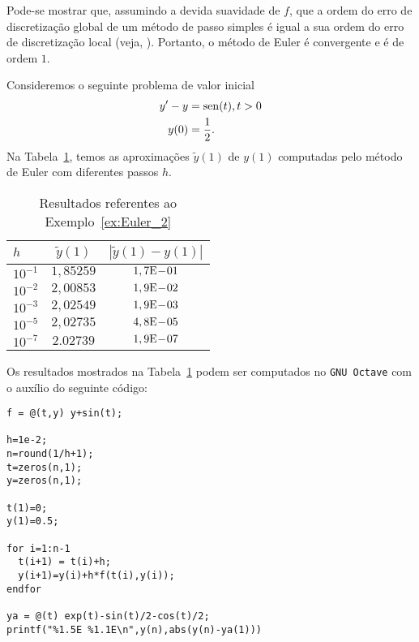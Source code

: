 \begin{obs}
  Pode-se mostrar que, assumindo a devida suavidade de $f$, que a ordem do erro de discretização global de um método de passo simples é igual a sua ordem do erro de discretização local (veja, \cite[Cap. 7, Seç. 7.2]{Stoer1993a}). Portanto, o método de Euler é convergente e é de ordem $1$.
\end{obs}

\begin{ex}\label{ex:Euler_2}
  Consideremos o seguinte problema de valor inicial
  \begin{align}
    y' - y &= \operatorname{sen}(t), t>0\label{eq:Euler_aux2}\\
    y(0) &= \frac{1}{2}.
  \end{align}
  Na Tabela~\ref{tab:ex_Euler_2}, temos as aproximações $\tilde{y}(1)$ de $y(1)$ computadas pelo método de Euler com diferentes passos $h$.
 
  \begin{table}[h!]
    \centering
    \begin{tabular}{l|cc}
      $h$ & $\tilde{y}(1)$ & $|\tilde{y}(1)-y(1)|$\\\hline
      $10^{-1}$ & $1,85259$ & $1,7\mathrm{E}\!-\!01$ \\
      $10^{-2}$ & $2,00853$ & $1,9\mathrm{E}\!-\!02$ \\
      $10^{-3}$ & $2,02549$ & $1,9\mathrm{E}\!-\!03$ \\
      $10^{-5}$ & $2,02735$ & $4,8\mathrm{E}\!-\!05$ \\
      $10^{-7}$ & $2.02739$ & $1,9\mathrm{E}\!-\!07$ \\\hline
    \end{tabular}
    \caption{Resultados referentes ao Exemplo~\ref{ex:Euler_2}}
    \label{tab:ex_Euler_2}
  \end{table}

\ifisoctave
Os resultados mostrados na Tabela~\ref{tab:ex_Euler_2} podem ser computados no \verb+GNU Octave+ com o auxílio do seguinte código:
\begin{verbatim}
f = @(t,y) y+sin(t);

h=1e-2;
n=round(1/h+1);
t=zeros(n,1);
y=zeros(n,1);

t(1)=0;
y(1)=0.5;

for i=1:n-1
  t(i+1) = t(i)+h;
  y(i+1)=y(i)+h*f(t(i),y(i));
endfor

ya = @(t) exp(t)-sin(t)/2-cos(t)/2;
printf("%1.5E %1.1E\n",y(n),abs(y(n)-ya(1)))
\end{verbatim}
\fi
\end{ex}

